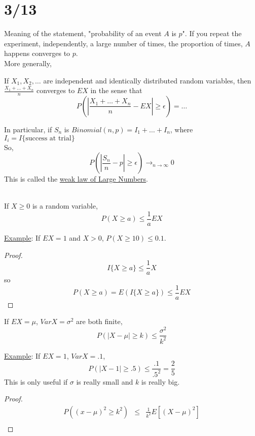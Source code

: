 \section*{3/13}
  Meaning of the statement, "probability of an event $A$ is $p$". If you repeat
  the experiment, independently, a large number of times, the proportion of
  times, $A$ happens converges to $p$.\\
  More generally,
  \begin{theorem}
    If $X_1, X_2, \ldots$ are independent and identically distributed random 
    variables, then $\frac{X_1 + \ldots + X_n}{n}$ converges to $EX$ in the 
    sense that 
    $$
      P\left(\left|\frac{X_1 + \ldots + X_n}{n} - EX\right| \ge \epsilon\right) = \ldots
    $$
  \end{theorem}
  In particular, if $S_n$ is $Binomial(n,p) = I_1 + \ldots + I_n$, where
  $I_i = I\{\text{success at trial}\}$\\
  So,
  $$
    P\left(\left|\frac{S_n}{n} - p\right| \ge \epsilon\right) \to_{n \to \infty}
    0
  $$
  This is called the \underline{weak law of Large Numbers}.\\\\
  \begin{theorem}
    If $X \ge 0$ is a random variable,
    $$
      P(X \ge a) \le \frac{1}{a} EX
    $$
  \end{theorem}
  \noindent\underline{Example}: If $EX = 1$ and $X >0$, $P(X \ge 10) \le 0.1$.\\
  \begin{proof}
    $$
      I\{X \ge a\} \le \frac{1}{a} X
    $$
    so
    $$
      P(X \ge a) = E(I\{X \ge a\}) \le \frac{1}{a} EX
    $$
  \end{proof}
  \begin{theorem}
    If $EX = \mu$, $Var X = \sigma^2$ are both finite,
    $$
      P(| X - \mu| \ge k) \le \frac{\sigma^2}{k^2}
    $$
  \end{theorem}
  \noindent \underline{Example}: If $EX = 1$, $VarX = .1$,
  $$
    P(|X - 1| \ge .5) \le \frac{.1}{.5^2} = \frac{2}{5}
  $$
  This is only useful if $\sigma$ is really small and $k$ is really big.
  \begin{proof}
    \begin{eqnarray*}
      P((x - \mu)^2 \ge k^2) & \le & \frac{1}{k^2} E[(X - \mu)^2]\\
    \end{eqnarray*}
  \end{proof}
